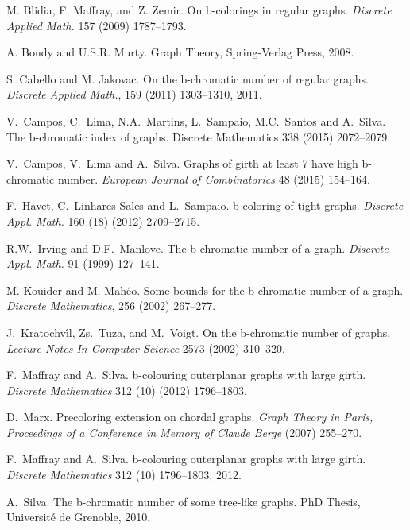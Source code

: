 \documentclass{llncs}
\begin{document}
\begin{thebibliography}{99}

M. Blidia, F. Maffray, and Z. Zemir. On b-colorings in regular graphs.
{\it Discrete Applied Math.} 157 (2009) 1787--1793.

A. Bondy and U.S.R. Murty.
Graph Theory, Spring-Verlag Press, 2008. 

S. Cabello and M. Jakovac. 
On the b-chromatic number of regular graphs. 
{\it Discrete Applied Math.}, 159 (2011) 1303--1310, 2011.

V.~Campos, C.~Lima, N.A.~Martins, L.~Sampaio, M.C.~Santos and A.~Silva. The b-chromatic index of graphs. Discrete Mathematics 338 (2015) 2072--2079.

V.~Campos, V.~Lima and A.~Silva.
Graphs of girth at least 7 have high b-chromatic number. 
{\it European Journal of Combinatorics} 48 (2015) 154--164.

F.~Havet, C.~Linhares-Sales and L.~Sampaio. b-coloring of tight graphs. {\it Discrete Appl. Math.} 160 (18) (2012) 2709--2715.

R.W.~Irving and D.F.~Manlove. 
 The b-chromatic number of a graph. 
{\it Discrete Appl. Math.} 91 (1999) 127--141.

M. Kouider and M. Mah\'eo.
 Some bounds for the b-chromatic number of a graph. 
 {\it Discrete Mathematics}, 256 (2002) 267--277.

J.~Kratochv\'{\i}l,  Zs.~Tuza,  and M.~Voigt. 
 On the b-chromatic number of graphs. 
 {\it Lecture Notes In Computer Science} 2573 (2002) 310--320.

F.~Maffray and A.~Silva.
b-colouring outerplanar graphs with large girth.
{\it Discrete Mathematics} 312 (10) (2012) 1796--1803.

    D.~Marx.
   Precoloring extension on chordal graphs.
 {\it Graph Theory in Paris, Proceedings of a Conference in Memory of Claude Berge} (2007) 255--270.


F.~Maffray and A.~Silva.
b-colouring outerplanar graphs with large girth.
{\it Discrete Mathematics} 312 (10) 1796--1803, 2012.


A.~Silva. 
 The b-chromatic number of some tree-like graphs. 
 PhD Thesis, Universit\'e de Grenoble, 2010.
\end{thebibliography}
\end{document}
